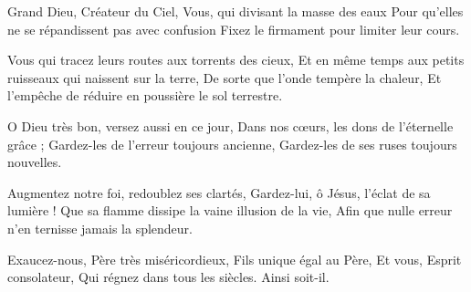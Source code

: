 Grand Dieu, Créateur du Ciel,
Vous, qui divisant la masse des eaux
Pour qu'elles ne se répandissent pas avec confusion
Fixez le firmament pour limiter leur cours.

Vous qui tracez leurs routes aux torrents des cieux,
Et en même temps aux petits ruisseaux qui naissent sur la terre,
De sorte que l'onde tempère la chaleur,
Et l'empêche de réduire en poussière le sol terrestre.

O Dieu très bon, versez aussi en ce jour,
Dans nos cœurs, les dons de l'éternelle grâce ;
Gardez-les de l'erreur toujours ancienne,
Gardez-les de ses ruses toujours nouvelles.

Augmentez notre foi, redoublez ses clartés,
Gardez-lui, ô Jésus, l'éclat de sa lumière !
Que sa flamme dissipe la vaine illusion de la vie,
Afin que nulle erreur n'en ternisse jamais la splendeur.

Exaucez-nous, Père très miséricordieux,
Fils unique égal au Père,
Et vous, Esprit consolateur,
Qui régnez dans tous les siècles.
Ainsi soit-il.